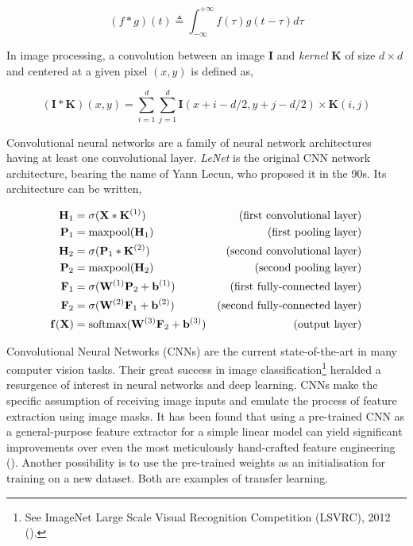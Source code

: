 \documentclass[11pt]{amsart}
\begin{document}
$$(f * g)(t) \triangleq \int_{-\infty}^{+\infty}f(\tau)g(t-\tau)d\tau$$

In image processing, a convolution between an image $\mathbf{I}$ and \emph{kernel} $\mathbf{K}$ of size $d \times d$ and centered at a given pixel $(x, y)$ is defined as,

$$(\mathbf{I} * \mathbf{K})(x, y) = \sum_{i = 1}^{d}\sum_{j = 1}^{d} \mathbf{I}(x + i -d/2, y + j - d/2) \times \mathbf{K}(i, j)$$

Convolutional neural networks are a family of neural network architectures having at least one convolutional layer. \emph{LeNet} is the original CNN network architecture, bearing the name of Yann Lecun, who proposed it in the 90s. Its architecture can be written,

\begin{align}
\mathbf{H}_1 &= \sigma(\mathbf{X} * \mathbf{K}^{(1)}) & \text{(first convolutional layer)}\notag \\
\mathbf{P}_1 &= \text{maxpool}(\mathbf{H}_1) & \text{(first pooling layer)}\notag \\
\mathbf{H}_2 &= \sigma(\mathbf{P}_1 * \mathbf{K}^{(2)}) & \text{(second convolutional layer)} \notag \\
\mathbf{P}_2 &= \text{maxpool}(\mathbf{H}_2) & \text{(second pooling layer)} \notag \\
\mathbf{F}_1 &= \sigma(\mathbf{W}^{(1)}\mathbf{P}_2 + \mathbf{b}^{(1)}) & \text{(first fully-connected layer)} \notag \\
\mathbf{F}_2 &= \sigma(\mathbf{W}^{(2)}\mathbf{F}_1 + \mathbf{b}^{(2)}) & \text{(second fully-connected layer)} \notag \\
\mathbf{f}(\mathbf{X}) &= \text{softmax}(\mathbf{W}^{(3)}\mathbf{F}_2 + \mathbf{b}^{(3)}) & \text{(output layer)} \notag
\end{align}

Convolutional Neural Networks (CNNs) are the current state-of-the-art in many computer vision tasks. Their great success in image classification\footnote{See ImageNet Large Scale Visual Recognition Competition (LSVRC), 2012 (\cite{krizhevsky2012imagenet}).} heralded a resurgence of interest in neural networks and deep learning. CNNs make the specific assumption of receiving image inputs and emulate the process of feature extraction using image masks. It has been found that using a pre-trained CNN as a general-purpose feature extractor for a simple linear model can yield significant improvements over even the most meticulously hand-crafted feature engineering (\cite{sharif2014cnn}). Another possibility is to use the pre-trained weights as an initialisation for training on a new dataset. Both are examples of transfer learning.
\end{document}
